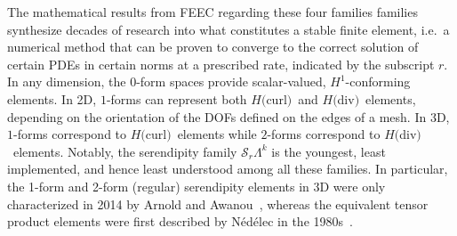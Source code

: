 \documentclass[manuscript,screen]{acmart}
\newcommand{\calS}{\mathcal{S}}
\newcommand{\hcurl}{$H($curl$)$}
\newcommand{\hdiv}{$H($div$)$}
\begin{document}
    The mathematical results from FEEC regarding these four families families synthesize decades of research into what constitutes a stable finite element, i.e.\ a numerical method that can be proven to converge to the correct solution of certain PDEs in certain norms at a prescribed rate, indicated by the subscript $r$.  In any dimension, the $0$-form spaces provide scalar-valued, $H^1$-conforming elements.  In 2D, $1$-forms can represent both \hcurl~and \hdiv~elements, depending on the orientation of the DOFs defined on the edges of a mesh.  In 3D, $1$-forms correspond to \hcurl~elements while $2$-forms correspond to \hdiv~elements.  Notably, the serendipity family $\calS_r\Lambda^k$ is the youngest, least implemented, and hence least understood among all these families.  In particular, the 1-form and 2-form (regular) serendipity elements in 3D were only characterized in 2014 by Arnold and Awanou~\cite{arnold2014finite}, whereas the equivalent tensor product elements were first described by N\'ed\'elec in the 1980s~\cite{N1980,N1986}.
 
 
 
 
 
\end{document}
